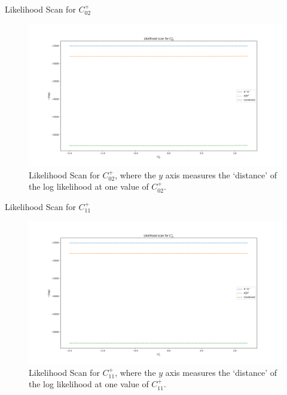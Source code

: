 \begin{frame}{Likelihood Scan for $C_{02}^{+}$}
\begin{figure}
    \centering
        \includegraphics[width=\textwidth]{2020_04_23/figs/P02.png}
    \caption{Likelihood Scan for $C_{02}^{+}$, where the $y$ axis measures the `distance' of the log likelihood at one value of $C_{02}^{+}$.}
    \label{fig:scanCP02}
\end{figure}
\end{frame}

\begin{frame}{Likelihood Scan for $C_{11}^{+}$}
\begin{figure}
    \centering
        \includegraphics[width=\textwidth]{2020_04_23/figs/P11.png}
    \caption{Likelihood Scan for $C_{11}^{+}$, where the $y$ axis measures the `distance' of the log likelihood at one value of $C_{11}^{+}$.}
    \label{fig:scanCP11}
\end{figure}
\end{frame}


